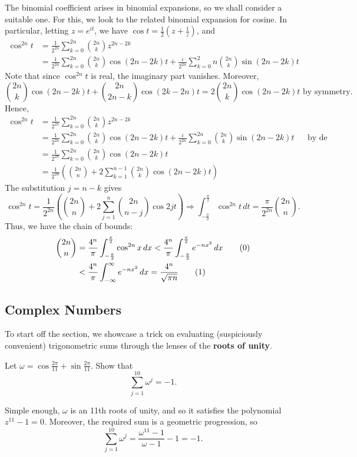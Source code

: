 \documentclass[../main.tex]{subfiles}
\begin{document}
The binomial coefficient arises in binomial expansions, so we shall consider a suitable one. For this, we look to the related binomial expansion for cosine. In particular, letting $z=e^{it}$, we have $\cos{t} = \frac{1}{2}\left(z+\frac{1}{z}\right)$, and \begin{align*}
    \cos^{2n} t &= \frac{1}{2^{2n}}\sum_{k=0}^{2n} \binom{2n}{k}z^{2n-2k} \\
    &= \frac{1}{2^{2n}}\sum_{k=0}^{2n} \binom{2n}{k}\cos{(2n-2k)t}+\frac{i}{2^{2n}}\sum_{k=0}^2n \binom{2n}{k}\sin{(2n-2k)t}
\end{align*}
Note that since $\cos^{2n}{t}$ is real, the imaginary part vanishes. Moreover, $$\binom{2n}{k}\cos{(2n-2k)t}+\binom{2n}{2n-k}\cos{(2k-2n)t}=2\binom{2n}{k}\cos{(2n-2k)t}\text{ by symmetry}.$$
Hence,
\begin{align*}
    \cos^{2n} t &= \frac{1}{2^{2n}}\sum_{k=0}^{2n} \binom{2n}{k}z^{2n-2k} \\
    &= \frac{1}{2^{2n}}\sum_{k=0}^{2n} \binom{2n}{k}\cos{(2n-2k)t}+\frac{i}{2^{2n}}\sum_{k=0}^{2n} \binom{2n}{k}\sin{(2n-2k)t} && \text{by de Moivre's theorem}\\
    &= \frac{1}{2^{2n}}\sum_{k=0}^{2n} \binom{2n}{k}\cos{(2n-2k)t} \\
    &= \frac{1}{2^{2n}}\left(\binom{2n}{n}+2\sum_{k=1}^{n-1}\binom{2n}{k}\cos{(2n-2k)t}\right)
\end{align*}
The substitution $j=n-k$ gives
$$
    \cos^{2n} t = \frac{1}{2^{2n}}\left(\binom{2n}{n}+2\sum_{j=1}^{n}\binom{2n}{n-j}\cos{2jt}\right)
\Longrightarrow
    \int_{-\frac{\pi}{2}}^{\frac{\pi}{2}}\cos^{2n} t \,dt = \frac{\pi}{2^{2n}}\binom{2n}{n}.
$$
Thus, we have the chain of bounds:
\begin{align*}
    \binom{2n}{n}&=\frac{4^n}{\pi}\int_{-\frac{\pi}{2}}^{\frac{\pi}{2}}\cos^{2n}{x} \,dx < \frac{4^n}{\pi}\int_{-\frac{\pi}{2}}^{\frac{\pi}{2}}e^{-nx^2} \,dx \tag{\theequation}\label{5.1-tangent-ineq}\\
    &< \frac{4^n}{\pi}\int_{-\infty}^{\infty}e^{-nx^2} \,dx = \frac{4^n}{\sqrt{\pi n}} \stepcounter{equation}\tag{\theequation}\label{5.1-tangent-eq}
\end{align*}
\subsection{Complex Numbers}
To start off the section, we showcase a trick on evaluating (suspiciously convenient) trigonometric sums through the lenses of the \textbf{roots of unity}.
\begin{example}
Let $\omega=\cos{\frac{2\pi}{11}}+\sin{\frac{2\pi}{11}}$.
Show that $$\sum_{j=1}^{10} \omega^{j}=-1.$$
\end{example}
Simple enough, $\omega$ is an 11th roots of unity, and so it satisfies the polynomial $z^{11}-1=0$. Moreover, the required sum is a geometric progression, so
$$\sum_{j=1}^{10} \omega^{j}=\frac{\omega^{11}-1}{\omega-1}-1=-1.$$
\end{document}
